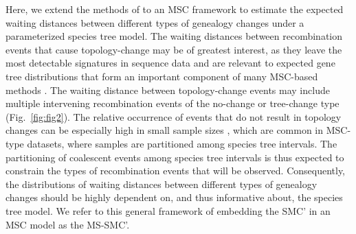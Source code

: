 \documentclass[11pt]{article}
\begin{document}



Here, we extend the methods of \citet{deng_distribution_2021} to an MSC framework
to estimate the expected waiting distances between different types of 
genealogy changes under a parameterized species tree model. 
The waiting distances between recombination events that cause topology-change 
may be of greatest interest, as they leave the most detectable signatures 
in sequence data and are relevant to expected gene tree distributions that form
an important component of many MSC-based methods \citep{
degnan2006discordance, baum_concordance_2007, knowles_estimating_2011}.
The waiting distance between topology-change events may include multiple
intervening recombination events of the no-change or tree-change type
(Fig.~\ref{fig:fig2}). 
The relative occurrence of events that do not result in topology 
changes can be especially high in small sample sizes \citep{wilton2015smc}, 
which are common in MSC-type datasets, where samples are partitioned 
among species tree intervals. 
The partitioning of 
coalescent events among species tree intervals is thus expected to constrain 
the types of recombination events that will be observed. Consequently, the
distributions of waiting distances between different types of 
genealogy changes should be highly dependent on, and thus informative about, 
the species tree model. We refer to this general framework of embedding the 
SMC' in an MSC model as the MS-SMC'.


\end{document}
